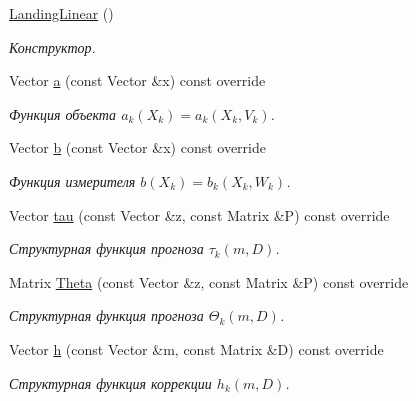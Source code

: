 \begin{DoxyCompactItemize}
\item 
\hyperlink{class_tasks_1_1_discrete_1_1_landing_linear_a635a395c8b9ef9bcece3201c26c258bf}{Landing\+Linear} ()\hypertarget{class_tasks_1_1_discrete_1_1_landing_linear_a635a395c8b9ef9bcece3201c26c258bf}{}\label{class_tasks_1_1_discrete_1_1_landing_linear_a635a395c8b9ef9bcece3201c26c258bf}

\begin{DoxyCompactList}\small\item\em Конструктор. \end{DoxyCompactList}\item 
Vector \hyperlink{class_tasks_1_1_discrete_1_1_landing_linear_af0c0c48603fc226055ee233f93fa21fc}{a} (const Vector \&x) const override
\begin{DoxyCompactList}\small\item\em Функция объекта $a_k(X_k) = a_k(X_k, V_k)$. \end{DoxyCompactList}\item 
Vector \hyperlink{class_tasks_1_1_discrete_1_1_landing_linear_a599d3491da6d84ba68c43433235e9980}{b} (const Vector \&x) const override
\begin{DoxyCompactList}\small\item\em Функция измерителя $b(X_k) = b_k(X_k, W_k)$. \end{DoxyCompactList}\item 
Vector \hyperlink{class_tasks_1_1_discrete_1_1_landing_linear_a8f2022967fae3dde3e7d2df3f7fa98f8}{tau} (const Vector \&z, const Matrix \&P) const override
\begin{DoxyCompactList}\small\item\em Структурная функция прогноза $\tau_k(m, D)$. \end{DoxyCompactList}\item 
Matrix \hyperlink{class_tasks_1_1_discrete_1_1_landing_linear_a88dda707914dea5698748f445563400f}{Theta} (const Vector \&z, const Matrix \&P) const override
\begin{DoxyCompactList}\small\item\em Структурная функция прогноза $\Theta_k(m, D)$. \end{DoxyCompactList}\item 
Vector \hyperlink{class_tasks_1_1_discrete_1_1_landing_linear_a9b1f90547fca3b460b48693b2e16219a}{h} (const Vector \&m, const Matrix \&D) const override
\begin{DoxyCompactList}\small\item\em Структурная функция коррекции $h_k(m, D)$. \end{DoxyCompactList}\item 

\end{DoxyCompactItemize}

